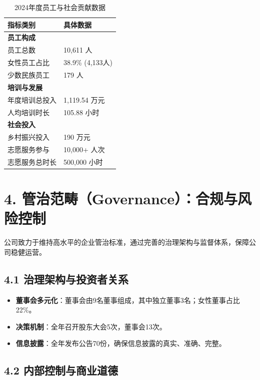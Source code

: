 \documentclass[a4paper,12pt]{article}
\begin{document}
\begin{table}[H]
    \centering
    \caption{2024年度员工与社会贡献数据}
    \label{tab:social_data}
    \renewcommand{\arraystretch}{1.2}
    \begin{tabular}{p{7cm} p{6cm}}
        \toprule
        \textbf{指标类别} & \textbf{具体数据} \\
        \midrule
        \textbf{员工构成} & \\
        员工总数 & 10,611 人 \\
        女性员工占比 & 38.9\% (4,133人) \\
        少数民族员工 & 179 人 \\
        \midrule
        \textbf{培训与发展} & \\
        年度培训总投入 & 1,119.54 万元 \\
        人均培训时长 & 105.88 小时 \\
        \midrule
        \textbf{社会投入} & \\
        乡村振兴投入 & 190 万元 \\
        志愿服务参与 & 10,000+ 人次 \\
        志愿服务总时长 & 500,000 小时 \\
        \bottomrule
    \end{tabular}
\end{table}

\section{4. 管治范畴（Governance）：合规与风险控制}

公司致力于维持高水平的企业管治标准，通过完善的治理架构与监督体系，保障公司稳健运营。

\subsection{4.1 治理架构与投资者关系}

\begin{itemize}
    \item \textbf{董事会多元化}：董事会由9名董事组成，其中独立董事3名；女性董事占比 22\%。
    \item \textbf{决策机制}：全年召开股东大会5次，董事会13次。
    \item \textbf{信息披露}：全年发布公告70份，确保信息披露的真实、准确、完整。
\end{itemize}

\subsection{4.2 内部控制与商业道德}
\end{document}
